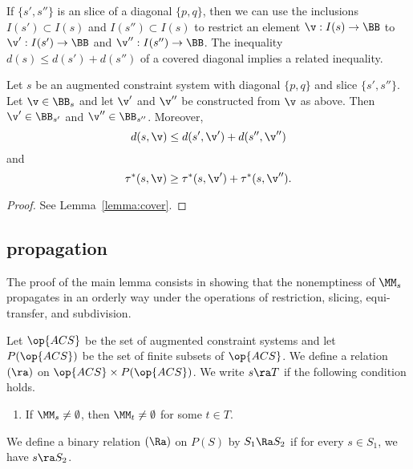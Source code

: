 If $\{s',s''\}$ is an slice of a diagonal $\{p,q\}$, then we can use the inclusions $I(s')\subset I(s)$ and $I(s'')\subset I(s)$ to restrict an element $\v:I(s)\to\BB$ to $\v':I(s')\to \BB$ and $\v'':I(s'')\to \BB$.  The inequality $d(s)\le d(s') + d(s'')$ of a covered diagonal implies a related inequality.

\begin{lemma}\label{lemma:cover2}
Let $s$ be an augmented constraint system with diagonal $\{p,q\}$ and slice
 $\{s',s''\}$. 
Let $\v\in \BB_s$ and let $\v'$ and $\v''$ be constructed from $\v$ as above.
Then  $\v'\in \BB_{s'}$ and $\v''\in \BB_{s''}$.
Moreover,
\begin{equation}
d(s,\v) \le d(s',\v') + d(s'',\v'')
\end{equation}
and
\begin{equation}
\tau^*(s,\v)\ge \tau^*(s,\v')+\tau^*(s,\v'').
\end{equation}
\end{lemma}

\begin{proof} See Lemma~\ref{lemma:cover}.
\end{proof}

\subsection{propagation}

The proof of the main lemma consists in showing that the nonemptiness
of $\MM_s$ propagates in an orderly way under the operations of
restriction, slicing, equi-transfer, and subdivision.

\begin{definition}[$\ra$~$\Ra$] 
Let $\op{ACS}$ be the set of augmented constraint systems
and let $P(\op{ACS})$ be the set of finite subsets of $\op{ACS}$. 
 We define a relation $(\ra)$ on $\op{ACS}\times P(\op{ACS})$.
We write $s\ra T$ if the following condition holds.
\begin{enumerate}
\item If $\MM_s\ne\emptyset$, then 
$\MM_t\ne\emptyset$ for some $t\in T$.
\end{enumerate}
We define a binary relation $(\Ra)$ on $P(S)$ by
$S_1\Ra S_2$ if for every $s\in S_1$, we have $s\ra S_2$.
\end{definition}

